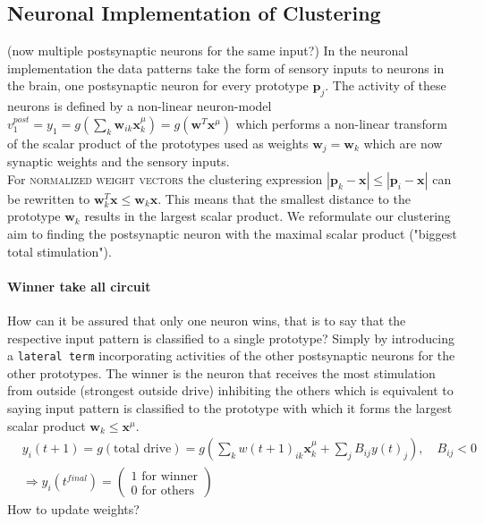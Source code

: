 \documentclass[11pt]{article}
\newcommand\abs[1]{\left|#1\right|}
\begin{document}
\subsection{Neuronal Implementation of Clustering}
(now multiple postsynaptic neurons for the same input?)
In the neuronal implementation the data patterns take the form of sensory inputs to neurons in the brain, one postsynaptic neuron for every prototype $\mathbf{p}_j$. The activity of these neurons is defined by a non-linear neuron-model $v_1^{post}=y_1=g(\sum_k \mathbf{w}_{ik}\mathbf{x}_k^\mu)=g(\mathbf{w}^T\mathbf{x}^\mu)$ which performs a non-linear transform of the scalar product of the prototypes used as weights $\mathbf{w}_j=\mathbf{w}_k$ which are now synaptic weights and the sensory inputs.\\
For \textsc{normalized weight vectors} the clustering expression $\abs{\mathbf{p}_k-\mathbf{x}}\leq\abs{\mathbf{p}_i-\mathbf{x}}$ can be rewritten to $\mathbf{w}_k^T\mathbf{x}\leq\mathbf{w}_k\mathbf{x}$. This means that the smallest distance to the prototype $\mathbf{w}_k$ results in the largest scalar product. We reformulate our clustering aim to finding the postsynaptic neuron with the maximal scalar product ("biggest total stimulation").

\paragraph{Winner take all circuit}
How can it be assured that only one neuron wins, that is to say that the respective input pattern is classified to a single prototype? Simply by introducing a \texttt{lateral term} incorporating activities of the other postsynaptic neurons for the other prototypes. The winner is the neuron that receives the most stimulation from outside (strongest outside drive) inhibiting the others which is equivalent to saying input pattern is classified to the prototype with which it forms the largest scalar product $\mathbf{w}_k\leq\mathbf{x}^\mu$.
\begin{align*}
&y_i(t+1)=g(\text{total drive})=g(\sum_k w(t+1)_{ik}\mathbf{x}_k^\mu+\sum_j B_{ij}y(t)_j),\quad B_{ij}<0\\
&\Rightarrow y_i(t^{final})=\left( \begin{array}{cc} \text{1 for winner}\\\text{0 for others}\end{array} \right)
\end{align*}
How to update weights?
\end{document}
